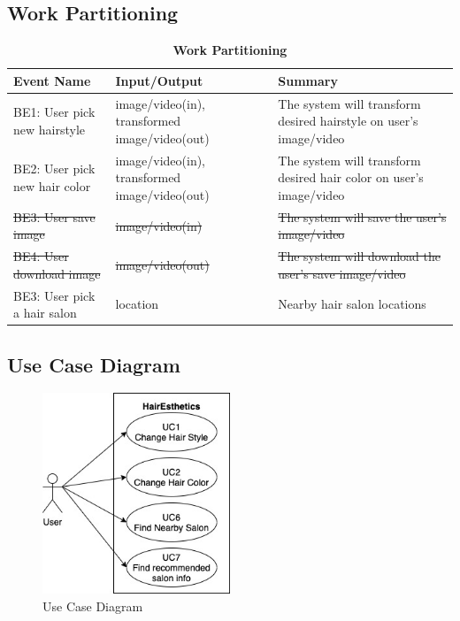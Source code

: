 \documentclass[12pt]{article}
\begin{document}
\subsection{Work Partitioning}
\begin{flushleft}
\begin{table}[bp hp]
\caption{\bf Work Partitioning}
    \begin{tabularx}{\linewidth}{|l|X|X|}
        \toprule {\bf Event Name} & {\bf Input/Output} & {\bf Summary}\\
        \midrule
        BE1: User pick new hairstyle & image/video(in), transformed image/video(out) & The system will transform desired hairstyle on user's image/video\\
        \hline
        BE2: User pick new hair color & image/video(in), transformed image/video(out) & The system will transform desired hair color on user's image/video\\
        \hline
        \sout{BE3: User save image} & \sout{image/video(in)} & \sout{The system will save the user's image/video}\\
        \hline
        \sout{BE4: User download image} & \sout{image/video(out)} & \sout{The system will download the user's save image/video}\\
        \hline
        BE3: User pick a hair salon & location & Nearby hair salon locations \\
        \bottomrule
    \end{tabularx}
\end{table}
\end{flushleft}

\subsection{Use Case Diagram}
\begin{figure}[H]
\begin{center}
 \includegraphics[width=0.5\textwidth]{use_case_diagram}
\caption{Use Case Diagram}
\end{center}
\end{figure}
\end{document}

